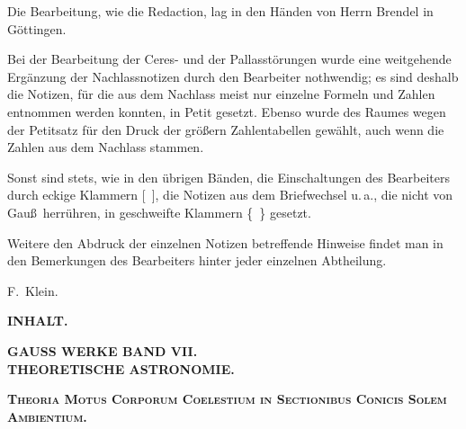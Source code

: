 \documentclass[10pt,a4paper]{article}
\begin{document}
Die Bearbeitung, wie die Redaction, lag in den Händen von Herrn Brendel in Göttingen.

Bei der Bearbeitung der Ceres- und der Pallasstörungen wurde eine weitgehende Ergänzung der Nachlassnotizen durch den Bearbeiter nothwendig; es sind deshalb die Notizen, für die aus dem Nachlass meist nur einzelne Formeln und Zahlen entnommen werden konnten, in Petit gesetzt. Ebenso wurde des Raumes wegen der Petitsatz für den Druck der größern Zahlentabellen gewählt, auch wenn die Zahlen aus dem Nachlass stammen.

Sonst sind stets, wie in den übrigen Bänden, die Einschaltungen des Bearbeiters durch eckige Klammern [\ ], die Notizen aus dem Briefwechsel u.\,a., die nicht von Gau\ss\ herrühren, in geschweifte Klammern \{~\} gesetzt.

Weitere den Abdruck der einzelnen Notizen betreffende Hinweise findet man in den Bemerkungen des Bearbeiters hinter jeder einzelnen Abtheilung.

\hfill F.~Klein.

\newpage

\begin{center}
\Large\textbf{INHALT.}
\end{center}

\vspace{0.5em}

\begin{center}
\textbf{GAUSS WERKE BAND VII.}\\[0.3em]
\textbf{THEORETISCHE ASTRONOMIE.}
\end{center}

\vspace{1em}

\begin{center}
\textbf{\textsc{Theoria Motus Corporum Coelestium in Sectionibus Conicis Solem Ambientium.}}
\end{center}

\vspace{0.5em}
\end{document}
